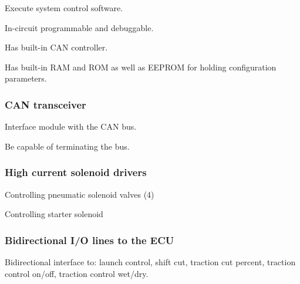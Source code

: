Execute system control software.

In-circuit programmable and debuggable.

Has built-in CAN controller.

Has built-in RAM and ROM as well as EEPROM for holding configuration
parameters.


\subsubsection{CAN transceiver}

Interface module with the CAN bus.

Be capable of terminating the bus.


\subsubsection{High current solenoid drivers}

Controlling pneumatic solenoid valves (4)

Controlling starter solenoid


\subsubsection{Bidirectional I/O lines to the ECU}

Bidirectional interface to: launch control, shift cut, traction cut
percent, traction control on/off, traction control wet/dry.